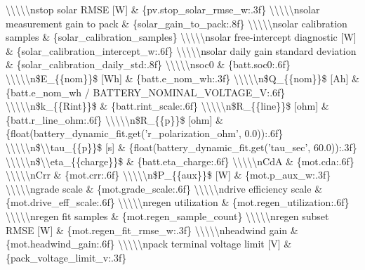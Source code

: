 \documentclass[a4paper,11pt]{article}
\begin{document}
\begin{enumerate}[leftmargin=1.8em]
\textbackslash{}\textbackslash{}\textbackslash{}\textbackslash{}\textbackslash{}nstop solar RMSE [W] \& \{pv.stop\_solar\_rmse\_w:.3f\} \textbackslash{}\textbackslash{}\textbackslash{}\textbackslash{}\textbackslash{}nsolar measurement gain to pack \& \{solar\_gain\_to\_pack:.8f\} \textbackslash{}\textbackslash{}\textbackslash{}\textbackslash{}\textbackslash{}nsolar calibration samples \& \{solar\_calibration\_samples\} \textbackslash{}\textbackslash{}\textbackslash{}\textbackslash{}\textbackslash{}nsolar free-intercept diagnostic [W] \& \{solar\_calibration\_intercept\_w:.6f\} \textbackslash{}\textbackslash{}\textbackslash{}\textbackslash{}\textbackslash{}nsolar daily gain standard deviation \& \{solar\_calibration\_daily\_std:.8f\} \textbackslash{}\textbackslash{}\textbackslash{}\textbackslash{}\textbackslash{}nsoc0 \& \{batt.soc0:.6f\} \textbackslash{}\textbackslash{}\textbackslash{}\textbackslash{}\textbackslash{}n\$E\_\{\{nom\}\}\$ [Wh] \& \{batt.e\_nom\_wh:.3f\} \textbackslash{}\textbackslash{}\textbackslash{}\textbackslash{}\textbackslash{}n\$Q\_\{\{nom\}\}\$ [Ah] \& \{batt.e\_nom\_wh / BATTERY\_NOMINAL\_VOLTAGE\_V:.6f\} \textbackslash{}\textbackslash{}\textbackslash{}\textbackslash{}\textbackslash{}n\$k\_\{\{Rint\}\}\$ \& \{batt.rint\_scale:.6f\} \textbackslash{}\textbackslash{}\textbackslash{}\textbackslash{}\textbackslash{}n\$R\_\{\{line\}\}\$ [ohm] \& \{batt.r\_line\_ohm:.6f\} \textbackslash{}\textbackslash{}\textbackslash{}\textbackslash{}\textbackslash{}n\$R\_\{\{p\}\}\$ [ohm] \& \{float(battery\_dynamic\_fit.get('r\_polarization\_ohm', 0.0)):.6f\} \textbackslash{}\textbackslash{}\textbackslash{}\textbackslash{}\textbackslash{}n\$\textbackslash{}\textbackslash{}tau\_\{\{p\}\}\$ [s] \& \{float(battery\_dynamic\_fit.get('tau\_sec', 60.0)):.3f\} \textbackslash{}\textbackslash{}\textbackslash{}\textbackslash{}\textbackslash{}n\$\textbackslash{}\textbackslash{}eta\_\{\{charge\}\}\$ \& \{batt.eta\_charge:.6f\} \textbackslash{}\textbackslash{}\textbackslash{}\textbackslash{}\textbackslash{}nCdA \& \{mot.cda:.6f\} \textbackslash{}\textbackslash{}\textbackslash{}\textbackslash{}\textbackslash{}nCrr \& \{mot.crr:.6f\} \textbackslash{}\textbackslash{}\textbackslash{}\textbackslash{}\textbackslash{}n\$P\_\{\{aux\}\}\$ [W] \& \{mot.p\_aux\_w:.3f\} \textbackslash{}\textbackslash{}\textbackslash{}\textbackslash{}\textbackslash{}ngrade scale \& \{mot.grade\_scale:.6f\} \textbackslash{}\textbackslash{}\textbackslash{}\textbackslash{}\textbackslash{}ndrive efficiency scale \& \{mot.drive\_eff\_scale:.6f\} \textbackslash{}\textbackslash{}\textbackslash{}\textbackslash{}\textbackslash{}nregen utilization \& \{mot.regen\_utilization:.6f\} \textbackslash{}\textbackslash{}\textbackslash{}\textbackslash{}\textbackslash{}nregen fit samples \& \{mot.regen\_sample\_count\} \textbackslash{}\textbackslash{}\textbackslash{}\textbackslash{}\textbackslash{}nregen subset RMSE [W] \& \{mot.regen\_fit\_rmse\_w:.3f\} \textbackslash{}\textbackslash{}\textbackslash{}\textbackslash{}\textbackslash{}nheadwind gain \& \{mot.headwind\_gain:.6f\} \textbackslash{}\textbackslash{}\textbackslash{}\textbackslash{}\textbackslash{}npack terminal voltage limit [V] \& \{pack\_voltage\_limit\_v:.3f\} 
\end{enumerate}
\end{document}
